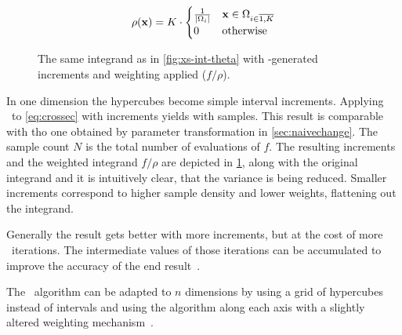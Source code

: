 \begin{equation}
  \label{eq:vegasrho}
  \rho(\vb{x}) = K\cdot
  \begin{cases}
    \frac{1}{\abs{\Omega_i}} & \vb{x}\in\Omega_{i\in\overline{1,K}} \\
    0 & \text{otherwise}
  \end{cases}
\end{equation}

\begin{figure}[ht]
  \centering {}
  \caption[\(2\pi\dv{\sigma}{\theta}\) scaled to increments found by
  \vegas\ ]{\label{fig:xs-int-vegas} The same integrand as
    in \cref{fig:xs-int-theta} with \vegas-generated increments and
    weighting applied (\(f/\rho\)).}
\end{figure}

In one dimension the hypercubes become simple interval
increments. Applying \vegas\ to \cref{eq:crossec} with
 increments yields
 with
 samples. This result is comparable
with tho one obtained by parameter transformation in
\cref{sec:naivechange}.  The sample count \(N\) is the total number of
evaluations of \(f\). The resulting increments and the weighted
integrand \(f/\rho\) are depicted in \cref{fig:xs-int-vegas}, along
with the original integrand and it is intuitively clear, that the
variance is being reduced. Smaller increments correspond to higher
sample density and lower weights, flattening out the integrand.

Generally the result gets better with more increments, but at the cost
of more \vegas\ iterations. The intermediate values of those
iterations can be accumulated to improve the accuracy of the end
result~\cite[197]{Lepage:19781an}.

The \vegas\ algorithm can be adapted to \(n\) dimensions by using a
grid of hypercubes instead of intervals and using the algorithm along
each axis with a slightly altered weighting
mechanism~\cite[197]{Lepage:19781an}.

